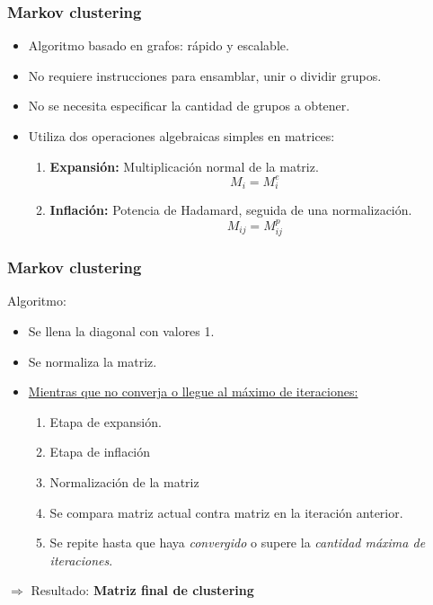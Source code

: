 \begin{frame}[t,fragile]
\frametitle {Markov clustering}
\begin{itemize}
	\item Algoritmo basado en grafos: rápido y escalable.
	\vspace{2mm}
	\item No requiere instrucciones para ensamblar, unir o dividir grupos.
	\vspace{2mm}
	\item No se necesita especificar la cantidad de grupos a obtener.
	\vspace{2mm}
	\item Utiliza dos operaciones algebraicas simples en matrices:
	\vspace{2mm}
	\begin{enumerate}
		\item \textbf{Expansión:} Multiplicación normal de la matriz. $$M_i = M_i ^ e$$
		\item \textbf{Inflación:} Potencia de Hadamard, seguida de una normalización. $$M_{ij} = M_{ij}^p$$
	\end{enumerate}
\end{itemize}
\end{frame}
\begin{frame}[t,fragile]
\frametitle {Markov clustering}
Algoritmo: 
\begin{itemize}
	\item Se llena la diagonal con valores 1.
	\vspace{2mm}
	\item Se normaliza la matriz.
	\vspace{2mm}
	\item \underline{Mientras que no converja o llegue al máximo de iteraciones:}
	\vspace{2mm}
	\begin{enumerate}
		\item Etapa de expansión.
		\vspace{2mm}
		\item Etapa de inflación
		\vspace{2mm}
		\item Normalización de la matriz
		\vspace{2mm}
		\item Se compara matriz actual contra matriz en la iteración anterior.
		\vspace{2mm}
		\item Se repite hasta que haya \textit{convergido} o supere la \textit{cantidad máxima de iteraciones}.
	\end{enumerate}
\end{itemize}

\begin{center}
		$\Rightarrow$ Resultado: \textbf{Matriz final de clustering}
\end{center}
\end{frame}
